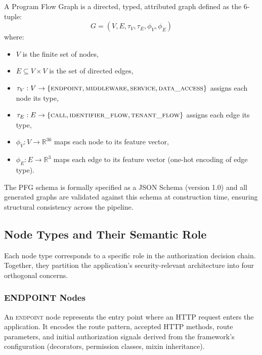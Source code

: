 \begin{definition}
A Program Flow Graph is a directed, typed, attributed graph defined as the 6-tuple:
\begin{equation}
G = (V, E, \tau_V, \tau_E, \phi_V, \phi_E)
\end{equation}
where:
\begin{itemize}
    \item $V$ is the finite set of nodes,
    \item $E \subseteq V \times V$ is the set of directed edges,
    \item $\tau_V: V \to \{\textsc{endpoint}, \textsc{middleware}, \textsc{service}, \textsc{data\_access}\}$ assigns each node its type,
    \item $\tau_E: E \to \{\textsc{call}, \textsc{identifier\_flow}, \textsc{tenant\_flow}\}$ assigns each edge its type,
    \item $\phi_V: V \to \mathbb{R}^{36}$ maps each node to its feature vector,
    \item $\phi_E: E \to \mathbb{R}^{3}$ maps each edge to its feature vector (one-hot encoding of edge type).
\end{itemize}
\end{definition}

The PFG schema is formally specified as a JSON Schema (version 1.0) and all generated graphs are validated against this schema at construction time, ensuring structural consistency across the pipeline.

\subsection{Node Types and Their Semantic Role}

Each node type corresponds to a specific role in the authorization decision chain. Together, they partition the application's security-relevant architecture into four orthogonal concerns.

\subsubsection{ENDPOINT Nodes}

An \textsc{endpoint} node represents the entry point where an HTTP request enters the application. It encodes the route pattern, accepted HTTP methods, route parameters, and initial authorization signals derived from the framework's configuration (decorators, permission classes, mixin inheritance).

